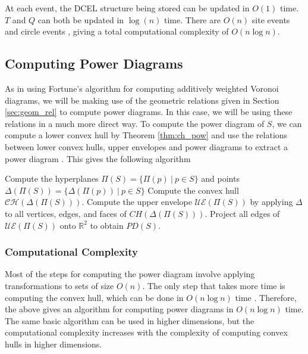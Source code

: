 \documentclass[a4paper, 11pt]{article}
\newcommand{\R}{\mathbb{R}}
\begin{document}
At each event, the DCEL structure being stored can be updated in $O(1)$ time. $T$ and $Q$ can both be updated in $\log(n)$ time. There are $O(n)$ site
events and circle events \cite{comp_geom}, giving a total
computational complexity of $O(n \log n)$.

\subsection{Computing Power Diagrams}

As in using Fortune's algorithm for computing additively weighted Voronoi diagrams, we will be making use of the geometric relations given in
Section \ref{sec:geom_rel} to compute power diagrams. In this case, we will be using these relations in a much more direct way. To compute the power
diagram of $S$, we can compute a lower convex hull by Theorem \ref{thm:ch_pow} and use the relations between lower convex hulls, upper envelopes and
power diagrams to extract a power diagram \cite{aurenhammer_power} . This gives the following algorithm

\begin{algorithm}
  \begin{algorithmic}[1]
    \State Compute the hyperplanes $\Pi(S) = \{ \Pi(p) \ | \ p \in S \}$ and points $\Delta( \Pi(S) ) = \{ \Delta( \Pi(p) ) \ | \ p \in S \}$
    \State Compute the convex hull $\mathcal{CH} ( \Delta( \Pi(S) ) )$.
    \State Compute the upper envelope $\mathcal{UE} ( \Pi(S) )$ by applying $\Delta$ to all vertices, edges, and faces of $CH( \Delta( \Pi(S) ) )$.
    \State Project all edges of $\mathcal{UE} ( \Pi(S) )$ onto $\R^2$ to obtain $PD(S)$.
    \EndFunction
  \end{algorithmic}
\end{algorithm}

\subsubsection{Computational Complexity}

Most of the steps for computing the power diagram involve applying transformations to sets of size $O(n)$. The only step that takes more time is
computing the convex hull, which can be done in $O(n \log n)$ time \cite{comp_geom}. Therefore, the above gives an algorithm for computing power
diagrams in $O(n \log n)$ time. The same basic algorithm can be used in higher dimensions, but the computational complexity increases with the complexity of
computing convex hulls in higher dimensions.
\end{document}
